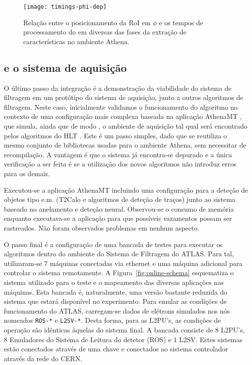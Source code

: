 \begin{figure}
\begin{center}
\texttt{[image: timings-phi-dep]}
\end{center}
\caption{Relação entre o posicionamento da RoI em $\phi$ e os tempos de
processamento do  em diversas das fases da extração de
características no ambiente Athena.}
\label{fig:timings-phi-dep}
\end{figure}

\subsection{ e o sistema de aquisição}

O último passo da integração é a demonstração da viabilidade do sistema de
filtragem em um protótipo do sistema de aquisição, junto a outros algoritmos
de filtragem. Neste caso, inicialmente validamos o funcionamento do algoritmo
no contexto de uma configuração mais complexa baseada na aplicação AthenaMT
\cite{aa:tns-2004-2}, que simula, ainda que de modo , o ambiente
de aquisição tal qual será encontrado pelos algoritmos do HLT
. Este é um passo simples, dado que se reutiliza o mesmo conjunto
de bibliotecas usadas para o ambiente Athena, sem necessitar de
recompilação. A vantagem é que o sistema já encontra-se depurado e a única
verificação a ser feita é se a utilização dos novos algoritmos não introduz
erros para os demais.

Executou-se a aplicação AthenaMT incluindo uma configuração para a deteção de
objetos tipo e.m. (T2Calo e algoritmos de deteção de traços) junto ao
sistema baseado no anelamento e deteção neural. Observou-se o consumo de
memória enquanto executava-se a aplicação para que possíveis vazamentos possam
ser rastreados. Não foram observados problemas em nenhum aspecto.

O passo final é a configuração de uma bancada de testes para executar os
algoritmos dentro do ambiente do Sistema de Filtragem do ATLAS. Para tal,
utilizaram-se 7 máquinas conectadas via  ethernet e uma máquina
adicional para controlar o sistema remotamente.  A
Figura~\ref{fig:online-schema} esquematiza o sistema utilizado para o teste e
o mapeamento das diversas aplicações nas máquinas. Esta bancada é,
naturalmente, uma versão bastante reduzida do sistema que estará disponível no
experimento. Para emular as condições de funcionamento do ATLAS, carregam-se
dados de elétrons simulados nos nós nomeados \texttt{ROS-*} e
\texttt{L2SV-*}. Desta forma, para as L2PU's, as condições de operação são
idênticas àquelas do sistema final. A bancada consiste de 8 L2PU's, 8
Emuladores do Sistema de Leitura do detetor (ROS) e 1 L2SV. Estes sistemas
estão conectados através de uma chave  e conectados ao
sistema controlador através da rede do CERN.


